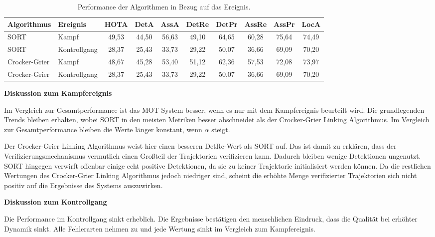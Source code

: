 \begin{table}[htbp]
\centering
\caption{Performance der Algorithmen in Bezug auf das Ereignis.}
\label{tab:HOTAübersEreig}
\begin{tabular}{
  l
  l
  S[table-format=2.2]
  S[table-format=2.2]
  S[table-format=2.2]
  S[table-format=2.2]
  S[table-format=2.2]
  S[table-format=2.2]
  S[table-format=2.2]
  S[table-format=2.2]
}
\toprule
{Algorithmus} & {Ereignis} & {HOTA} & {DetA} & {AssA} & {DetRe} & {DetPr} & {AssRe} & {AssPr} & {LocA} \\
\midrule
SORT          & Kampf      & 49,53 & 44,50 & 56,63 & 49,10  & 64,65  & 60,28  & 75,64  & 74,49 \\
SORT          & Kontrollgang & 28,37 & 25,43 & 33,73 & 29,22  & 50,07  & 36,66  & 69,09  & 70,20 \\
Crocker-Grier & Kampf      & 48,67 & 45,28 & 53,40 & 51,12  & 62,36  & 57,53  & 72,08  & 73,97 \\
Crocker-Grier & Kontrollgang & 28,37 & 25,43 & 33,73 & 29,22  & 50,07  & 36,66  & 69,09  & 70,20 \\
\bottomrule
\end{tabular}
\end{table}

\textbf{Diskussion zum Kampfereignis}\par
Im Vergleich zur Gesamtperformance ist das MOT System besser, wenn es nur mit dem Kampfereignis beurteilt wird. Die grundlegenden Trends bleiben erhalten, wobei SORT in den meisten Metriken besser abschneidet als der Crocker-Grier Linking Algorithmus. Im Vergleich zur Gesamtperformance bleiben die Werte länger konstant, wenn \(\alpha\) steigt. \par

Der Crocker-Grier Linking Algorithmus weist hier einen besseren DetRe-Wert als SORT auf. Das ist damit zu erklären, dass der Verifizierungsmechanismus vermutlich einen Großteil der Trajektorien verifizieren kann. Dadurch bleiben wenige Detektionen ungenutzt. SORT hingegen verwirft offenbar einige echt positive Detektionen, da sie zu keiner Trajektorie initialisiert werden können. Da die restlichen Wertungen des Crocker-Grier Linking Algorithmus jedoch niedriger sind, scheint die erhöhte Menge verifizierter Trajektorien sich nicht positiv auf die Ergebnisse des Systems auszuwirken.\dubpar  


\textbf{Diskussion zum Kontrollgang}\par
Die Performance im Kontrollgang sinkt erheblich. Die Ergebnisse bestätigen den menschlichen Eindruck, dass die Qualität bei erhöhter Dynamik sinkt. Alle Fehlerarten nehmen zu und jede Wertung sinkt im Vergleich zum Kampfereignis. \par

